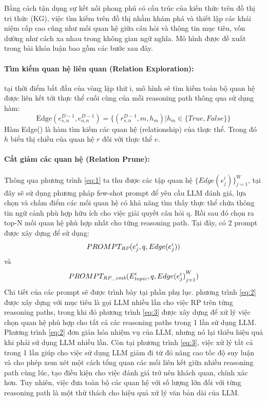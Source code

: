 Bằng cách tận dụng sự kết nối phong phú có cấu trúc của kiến thức trên đồ thị tri thức (KG), việc tìm kiếm trên đồ thị nhằm khám phá và thiết lập các khái niệm cấp cao cũng như mối quan hệ giữa câu hỏi và thông tin mục tiêu, vốn dường như cách xa nhau trong không gian ngữ nghĩa. Mô hình được đề xuất trong bài khóa luận bao gồm các bước sau đây.
\paragraph{Tìm kiếm quan hệ liên quan (Relation Exploration):}
tại thời điểm bắt đầu của vòng lặp thứ i, mô hình sẽ tìm kiếm toàn bộ quan hệ được liên kết tới thực thể cuối cùng của mỗi reasoning path thông qua sử dụng hàm:
\begin{equation}
    \text{Edge}(e_{s,n}^{D-1}, e_{o,n}^{D-1}) = \{(r_{s,n}^{D-1}, m, h_m) | h_m \in \{True, False\}\}
    \label{eq:1}
\end{equation}
Hàm Edge() là hàm tìm kiếm các quan hệ (relationship) của thực thể. Trong đó $h$ biểu thị chiều của quan hệ $r$ đối với thực thể $e$.

\paragraph{Cắt giảm các quan hệ (Relation Prune):}
Thông qua phương trình \ref{eq:1} ta thu được các tập quan hệ
$\{{Edge(e^i_j )}\}^W_{j=1}$, tại đây sẽ sử dụng phương pháp few-shot prompt để yêu cầu LLM đánh giá, lựa chọn và chấm điểm các mối quan hệ có khả năng tìm thấy thực thể chứa thông tin ngữ cảnh phù hợp hữu ích cho việc giải quyết câu hỏi q. Rồi sau đó chọn ra top-N mối quan hệ phù hợp nhất cho từng reasoning path. Tại đây, có 2 prompt được xây dựng để sử dụng:
\begin{equation}
    PROMPT_\emph{RP}(e^i_j , q, Edge(e^i_j))
    \label{eq:2}
\end{equation}
và
\begin{equation}
    PROMPT_\emph{RP\_cmb} (E^i_\emph{topic}, q, {Edge(e^i_j)}^W_{j=1})
    \label{eq:3}
\end{equation}
Chi tiết của các prompt sẽ được trình bày tại phần phụ lục. phương trình \ref{eq:2} được xây dựng với mục tiêu là gọi LLM nhiều lần cho việc RP trên từng reasoning paths, trong khi đó phương trình \ref{eq:3} được xây dựng để xử lý việc chọn quan hệ phù hợp cho tất cả các reasoning paths trong 1 lần sử dụng LLM. Phương trình \ref{eq:2} đơn giản hóa nhiệm vụ của LLM, nhưng nó lại thiếu hiệu quả khi phải sử dụng LLM nhiều lần. Còn tại phương trình \ref{eq:3}, việc xử lý tất cả trong 1 lần giúp cho việc sử dụng LLM giảm đi từ đó nâng cao tốc độ suy luận và cho phép xem xét một cách tổng quan các mối liên kết giữa nhiều reasoning path cùng lúc, tạo điều kiện cho việc đánh giá trở nên khách quan, chính xác hơn. Tuy nhiên, việc đưa toàn bộ các quan hệ với số lượng lớn đối với từng reasoning path là một thử thách cho hiệu quả xử lý văn bản dài của LLM.

